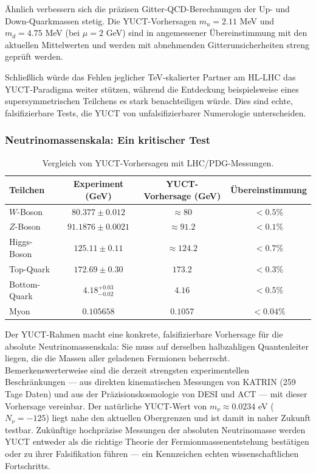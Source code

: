 \documentclass[11pt,a4paper]{article}
\begin{document}
	Ähnlich verbessern sich die präzisen Gitter-QCD-Berechnungen der Up- und Down-Quarkmassen stetig. Die YUCT-Vorhersagen $m_u = 2.11$ MeV und $m_d = 4.75$ MeV (bei $\mu = 2$ GeV) sind in angemessener Übereinstimmung mit den aktuellen Mittelwerten und werden mit abnehmenden Gitterunsicherheiten streng geprüft werden.
	
	Schließlich würde das Fehlen jeglicher TeV‑skalierter Partner am HL‑LHC das YUCT-Paradigma weiter stützen, während die Entdeckung beispielsweise eines supersymmetrischen Teilchens es stark benachteiligen würde. Dies sind echte, falsifizierbare Tests, die YUCT von unfalsifizierbarer Numerologie unterscheiden.
	
	\subsubsection{Neutrinomassenskala: Ein kritischer Test}
	\begin{table}[h]
		\centering
		\caption{Vergleich von YUCT-Vorhersagen mit LHC/PDG-Messungen.}
		\normalsize
		\label{tab:lhc_comparison}
		\begin{tabular}{l c c c}
			\toprule
			Teilchen & Experiment (GeV) & YUCT-Vorhersage (GeV) & Übereinstimmung \\
			\midrule
			$W$-Boson  & $80.377 \pm 0.012$ & $\approx 80$ & $<0.5\%$ \\
			$Z$-Boson  & $91.1876 \pm 0.0021$ & $\approx 91.2$ & $<0.1\%$ \\
			Higgs-Boson & $125.11 \pm 0.11$ & $\approx 124.2$ & $<0.7\%$ \\
			Top-Quark  & $172.69 \pm 0.30$ & $173.2$ & $<0.3\%$ \\
			Bottom-Quark & $4.18^{+0.03}_{-0.02}$ & $4.16$ & $<0.5\%$ \\
			Myon       & $0.105658$ & $0.1057$ & $<0.04\%$ \\
			\bottomrule
		\end{tabular}
	\end{table}
	
	Der YUCT-Rahmen macht eine konkrete, falsifizierbare Vorhersage für die absolute Neutrinomassenskala: Sie muss auf derselben halbzahligen Quantenleiter liegen, die die Massen aller geladenen Fermionen beherrscht. Bemerkenswerterweise sind die derzeit strengsten experimentellen Beschränkungen — aus direkten kinematischen Messungen von KATRIN (259 Tage Daten) und aus der Präzisionskosmologie von DESI und ACT — mit dieser Vorhersage vereinbar. Der natürliche YUCT-Wert von $m_\nu \approx 0.0234$ eV ($N_\nu = -125$) liegt nahe den aktuellen Obergrenzen und ist damit in naher Zukunft testbar. Zukünftige hochpräzise Messungen der absoluten Neutrinomasse werden YUCT entweder als die richtige Theorie der Fermionmassenentstehung bestätigen oder zu ihrer Falsifikation führen — ein Kennzeichen echten wissenschaftlichen Fortschritts.
	
\end{document}
